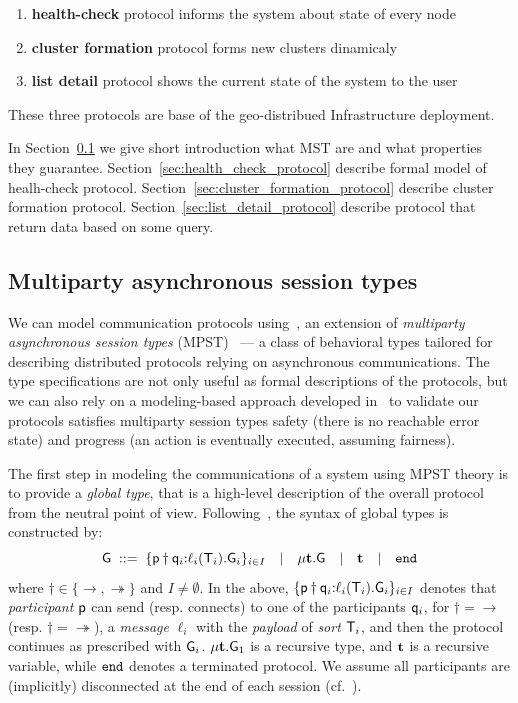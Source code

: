 \begin{enumerate}[start=1,label={(\bfseries \arabic*)}]
\item \textbf{health-check} protocol informs the system about state of every node 
\item \textbf{cluster formation} protocol forms new clusters dinamicaly
\item \textbf{list detail} protocol shows the current state of the system to the user
\end{enumerate}

These three protocols are base of the geo-distribued Infrastructure deployment.

In Section~\ref{sec:multiparty} we give short introduction what MST are and what properties they guarantee. Section~\ref{sec:health_check_protocol} describe formal model of healh-check protocol. Section~\ref{sec:cluster_formation_protocol} describe cluster formation protocol. Section~\ref{sec:list_detail_protocol} describe protocol that return data based on some query.
%
%
\subsection{Multiparty asynchronous session types}\label{sec:multiparty}
%
We can model communication protocols %
using~\cite{HuY17}, an extension of \emph{multiparty asynchronous session types} (MPST)~\cite{HondaYC08} %
--- a class of behavioral types tailored for describing distributed protocols relying on asynchronous
communications. 
The type specifications are not only useful as formal descriptions of the protocols, but we can also rely on a modeling-based approach developed in~\cite{HuY17} to validate our protocols satisfies multiparty session types safety (there is no reachable error state) and progress (an action is eventually executed, assuming
fairness). %

The first step in modeling the communications of a system using MPST theory 
is to provide a \emph{global type}, that is a high-level description of the overall protocol from the neutral 
point of view. 
Following~\cite{HuY17}, the syntax of global types is constructed by:\\ 
\[
{\sf G} \; ::= \;
\{{\sf p}\dagger{\sf q}_i{:}\ell_i({\mathsf T}_i).{\sf G}_i\}_{i\in I}  \quad | \quad 
\mu \textbf{t}.{\sf G} \quad | \quad 
\textbf{t} \quad | \quad
\mathtt{end}
\] 
where $\dagger\in\{\to, \twoheadrightarrow\}$ and $I\not=\emptyset$. 
In the above, $\{{\sf p}\dagger{\sf q}_i{:}\ell_i({\mathsf T}_i).{\sf G}_i\}_{i\in I}$
denotes that \emph{participant} ${\sf p}$ can send (resp. connects) to one of the participants ${\sf q}_i$, 
for $\dagger=\to$ (resp. $\dagger=\twoheadrightarrow$), 
a \emph{message} $\ell_i$ with the \emph{payload} of \emph{sort} ${\mathsf T}_i$, 
and then the protocol continues as prescribed with ${\sf G}_i$.  
$\mu \textbf{t}.{\sf G}_1$ is a recursive type, and $\textbf{t}$ is a recursive variable, 
while $\mathtt{end}$ denotes a terminated protocol. We assume all participants are (implicitly) disconnected at the end of each session (cf.~\cite{HuY17}). 

